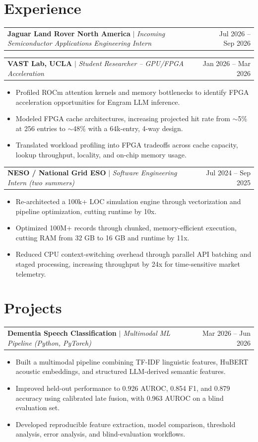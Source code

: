 \documentclass[10pt,letterpaper]{article}
\newcommand{\resumeItem}[1]{\item #1}
\newcommand{\resumeExpHeading}[3]{\begin{tabularx}{\textwidth}{X r}\textbf{#1} $\mid$ \textit{#2} & #3 \\\end{tabularx}\vspace{0pt}}
\newcommand{\resumeProjectHeading}[3]{\begin{tabularx}{\textwidth}{X r}\textbf{#1} \textit{#2} & #3 \\\end{tabularx}\vspace{0pt}}
\newenvironment{resumeItemList}{\begin{small}\begin{itemize}[leftmargin=*, itemsep=2pt, topsep=3pt, parsep=0pt]}{\end{itemize}\end{small}\vspace{4pt}}
\begin{document}
\section*{Experience}
\resumeExpHeading{Jaguar Land Rover North America}{Incoming Semiconductor Applications Engineering Intern}{Jul 2026 -- Sep 2026}
\resumeExpHeading{VAST Lab, UCLA}{Student Researcher -- GPU/FPGA Acceleration}{Jan 2026 -- Mar 2026}
\begin{resumeItemList}
    \resumeItem{Profiled ROCm attention kernels and memory bottlenecks to identify FPGA acceleration opportunities for Engram LLM inference.}
    \resumeItem{Modeled FPGA cache architectures, increasing projected hit rate from $\sim$5\% at 256 entries to $\sim$48\% with a 64k-entry, 4-way design.}
    \resumeItem{Translated workload profiling into FPGA tradeoffs across cache capacity, lookup throughput, locality, and on-chip memory usage.}
\end{resumeItemList}
\resumeExpHeading{NESO / National Grid ESO}{Software Engineering Intern (two summers)}{Jul 2024 -- Sep 2025}
\begin{resumeItemList}
    \resumeItem{Re-architected a 100k+ LOC simulation engine through vectorization and pipeline optimization, cutting runtime by 10x.}
    \resumeItem{Optimized 100M+ records through chunked, memory-efficient execution, cutting RAM from 32 GB to 16 GB and runtime by 11x.}
    \resumeItem{Reduced CPU context-switching overhead through parallel API batching and staged processing, increasing throughput by 24x for time-sensitive market telemetry.}
\end{resumeItemList}

\section*{Projects}
\resumeProjectHeading{Dementia Speech Classification}{$\mid$ Multimodal ML Pipeline (Python, PyTorch)}{Mar 2026 -- Jun 2026}
\begin{resumeItemList}
    \resumeItem{Built a multimodal pipeline combining TF-IDF linguistic features, HuBERT acoustic embeddings, and structured LLM-derived semantic features.}
    \resumeItem{Improved held-out performance to 0.926 AUROC, 0.854 F1, and 0.879 accuracy using calibrated late fusion, with 0.963 AUROC on a blind evaluation set.}
    \resumeItem{Developed reproducible feature extraction, model comparison, threshold analysis, error analysis, and blind-evaluation workflows.}
\end{resumeItemList}
\end{document}
